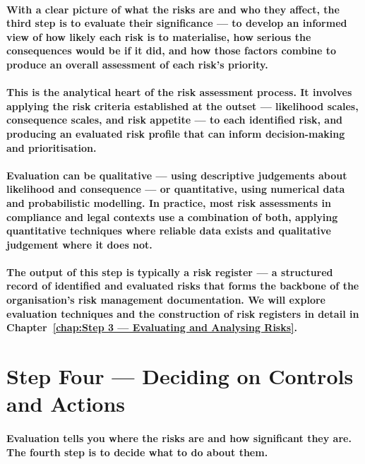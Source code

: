 \paragraph{With a clear picture of what the risks are and who they affect, the third step is to evaluate their significance — to develop an informed view of how likely each risk is to materialise, how serious the consequences would be if it did, and how those factors combine to produce an overall assessment of each risk's priority.}
\paragraph{This is the analytical heart of the risk assessment process. It involves applying the risk criteria established at the outset — likelihood scales, consequence scales, and risk appetite — to each identified risk, and producing an evaluated risk profile that can inform decision-making and prioritisation.}
\paragraph{Evaluation can be qualitative — using descriptive judgements about likelihood and consequence — or quantitative, using numerical data and probabilistic modelling. In practice, most risk assessments in compliance and legal contexts use a combination of both, applying quantitative techniques where reliable data exists and qualitative judgement where it does not.}
\paragraph{The output of this step is typically a \textbf{risk register} — a structured record of identified and evaluated risks that forms the backbone of the organisation's risk management documentation. We will explore evaluation techniques and the construction of risk registers in detail in Chapter~\ref{chap:Step 3 — Evaluating and Analysing Risks}.}

\section{Step Four — Deciding on Controls and Actions}
\paragraph{Evaluation tells you where the risks are and how significant they are. The fourth step is to decide what to do about them.}
